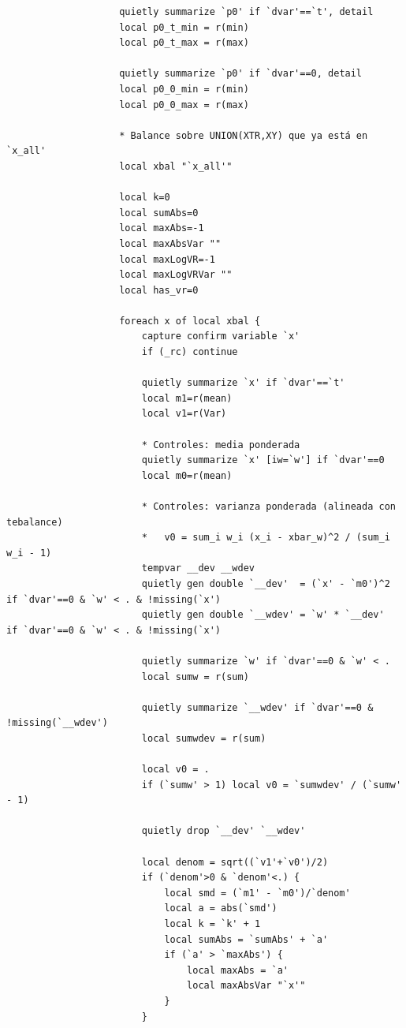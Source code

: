 \documentclass[12pt]{article}
\begin{document}
\begin{lstlisting}
                    quietly summarize `p0' if `dvar'==`t', detail
                    local p0_t_min = r(min)
                    local p0_t_max = r(max)

                    quietly summarize `p0' if `dvar'==0, detail
                    local p0_0_min = r(min)
                    local p0_0_max = r(max)

                    * Balance sobre UNION(XTR,XY) que ya está en `x_all'
                    local xbal "`x_all'"

                    local k=0
                    local sumAbs=0
                    local maxAbs=-1
                    local maxAbsVar ""
                    local maxLogVR=-1
                    local maxLogVRVar ""
                    local has_vr=0

                    foreach x of local xbal {
                        capture confirm variable `x'
                        if (_rc) continue

                        quietly summarize `x' if `dvar'==`t'
                        local m1=r(mean)
                        local v1=r(Var)

                        * Controles: media ponderada
                        quietly summarize `x' [iw=`w'] if `dvar'==0
                        local m0=r(mean)

                        * Controles: varianza ponderada (alineada con tebalance)
                        *   v0 = sum_i w_i (x_i - xbar_w)^2 / (sum_i w_i - 1)
                        tempvar __dev __wdev
                        quietly gen double `__dev'  = (`x' - `m0')^2 if `dvar'==0 & `w' < . & !missing(`x')
                        quietly gen double `__wdev' = `w' * `__dev'  if `dvar'==0 & `w' < . & !missing(`x')

                        quietly summarize `w' if `dvar'==0 & `w' < .
                        local sumw = r(sum)

                        quietly summarize `__wdev' if `dvar'==0 & !missing(`__wdev')
                        local sumwdev = r(sum)

                        local v0 = .
                        if (`sumw' > 1) local v0 = `sumwdev' / (`sumw' - 1)

                        quietly drop `__dev' `__wdev'

                        local denom = sqrt((`v1'+`v0')/2)
                        if (`denom'>0 & `denom'<.) {
                            local smd = (`m1' - `m0')/`denom'
                            local a = abs(`smd')
                            local k = `k' + 1
                            local sumAbs = `sumAbs' + `a'
                            if (`a' > `maxAbs') {
                                local maxAbs = `a'
                                local maxAbsVar "`x'"
                            }
                        }


\end{lstlisting}
\end{document}
